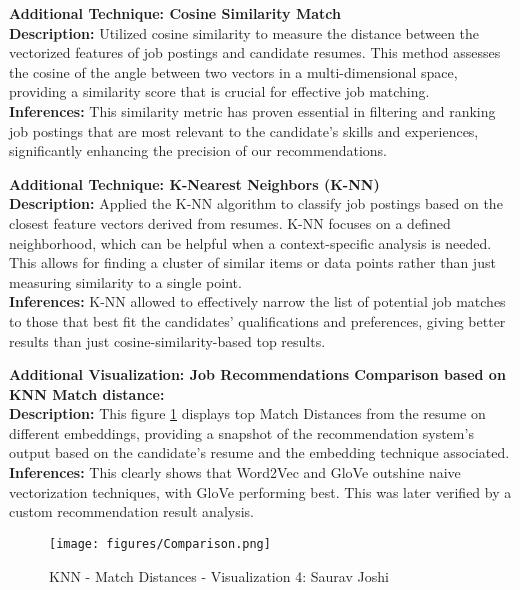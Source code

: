 \documentclass[a4paper,10pt]{article}
\begin{document}
\textbf{Additional Technique: Cosine Similarity Match}\\
\textbf{Description:} Utilized cosine similarity to measure the distance between the vectorized features of job postings and candidate resumes. This method assesses the cosine of the angle between two vectors in a multi-dimensional space, providing a similarity score that is crucial for effective job matching.\\
\textbf{Inferences:} This similarity metric has proven essential in filtering and ranking job postings that are most relevant to the candidate's skills and experiences, significantly enhancing the precision of our recommendations.

\textbf{Additional Technique: K-Nearest Neighbors (K-NN)}\\
\textbf{Description:} Applied the K-NN algorithm to classify job postings based on the closest feature vectors derived from resumes. K-NN focuses on a defined neighborhood, which can be helpful when a context-specific analysis is needed. This allows for finding a cluster of similar items or data points rather than just measuring similarity to a single point.
\\
\textbf{Inferences:} K-NN allowed to effectively narrow the list of potential job matches to those that best fit the candidates' qualifications and preferences, giving better results than just cosine-similarity-based top results.

\textbf{Additional Visualization: Job Recommendations Comparison based on KNN Match distance: }\\
\textbf{Description:} This figure \ref{fig_comparison} displays top Match Distances from the resume on different embeddings, providing a snapshot of the recommendation system’s output based on the candidate's resume and the embedding technique associated.\\
\textbf{Inferences:} This clearly shows that Word2Vec and GloVe outshine naive vectorization techniques, with GloVe performing best. This was later verified by a custom recommendation result analysis. 

 \begin{figure}[ht]
    \centering
    \texttt{[image: figures/Comparison.png]}
    \caption{KNN - Match Distances - Visualization 4: Saurav Joshi}
    \label{fig_comparison}
    \end{figure}
\end{document}
